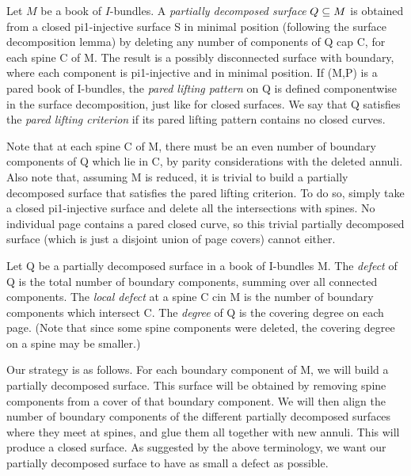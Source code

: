 \begin{defn}

Let $M$ be a book of $I$-bundles. A \emph{partially decomposed surface} $Q \subseteq
M$ is obtained from a closed pi1-injective surface S in minimal position
(following the surface decomposition lemma) by deleting any number of
components of Q cap C, for each spine C of M. The result is a possibly
disconnected surface with boundary, where each component is pi1-injective and
in minimal position. If (M,P) is a pared book of I-bundles, the \emph{pared
lifting pattern} on Q is defined componentwise in the surface decomposition,
just like for closed surfaces. We say that Q satisfies the \emph{pared lifting
criterion} if its pared lifting pattern contains no closed curves.

\end{defn}

Note that at each spine C of M, there must be an even number of boundary
components of Q which lie in C, by parity considerations with the deleted
annuli. Also note that, assuming M is reduced, it is trivial to build
a partially decomposed surface that satisfies the pared lifting criterion. To
do so, simply take a closed pi1-injective surface and delete all the
intersections with spines.  No individual page contains a pared closed curve,
so this trivial partially decomposed surface (which is just a disjoint union of
page covers) cannot either.

\begin{defn}

Let Q be a partially decomposed surface in a book of I-bundles M. The
\emph{defect} of Q is the total number of boundary components, summing over all
connected components. The \emph{local defect} at a spine C cin M is the number
of boundary components which intersect C. The \emph{degree} of Q is the
covering degree on each page. (Note that since some spine components were
deleted, the covering degree on a spine may be smaller.)

\end{defn}

Our strategy is as follows. For each boundary component of M, we will build
a partially decomposed surface. This surface will be obtained by removing spine
components from a cover of that boundary component. We will then align the
number of boundary components of the different partially decomposed surfaces
where they meet at spines, and glue them all together with new annuli. This
will produce a closed surface. As suggested by the above terminology, we want
our partially decomposed surface to have as small a defect as possible.

